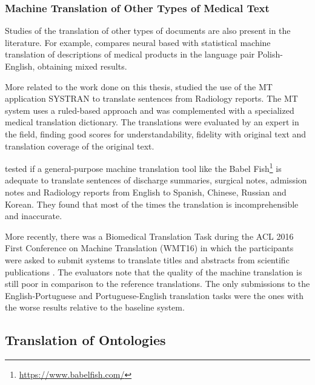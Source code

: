\subsubsection{Machine Translation of Other Types of Medical Text}

Studies of the translation of other types of documents are also present in the literature. For example, \citep{Wok2015} compares neural based with statistical machine translation of descriptions of medical products in the language pair Polish-English, obtaining mixed results.

More related to the work done on this thesis, \citep{Castilla2007a} studied the use of the MT application SYSTRAN to translate sentences from Radiology reports. The MT system uses a ruled-based approach and was complemented with a specialized medical translation dictionary. The translations were evaluated by an expert in the field, finding good scores for understandability, fidelity with original text and translation coverage of the original text.

\citep{Zeng-Treitler2010} tested if a general-purpose machine translation tool like the Babel Fish\footnote{\url{https://www.babelfish.com/}} is adequate to translate sentences of discharge summaries, surgical notes, admission notes and Radiology reports from English to Spanish, Chinese, Russian and Korean. They found that most of the times the translation is incomprehensible and inaccurate.

More recently, there was a Biomedical Translation Task during the ACL 2016 First Conference on Machine Translation (WMT16) in which the participants were asked to submit systems to translate titles and abstracts from scientific publications \citep{Bojar2016}. The evaluators note that the quality of the machine translation is still poor in comparison to the reference translations. The only submissions to the English-Portuguese and Portuguese-English translation tasks \citep{Aires2016} were the ones with the worse results relative to the baseline system.

\subsection{Translation of Ontologies}

